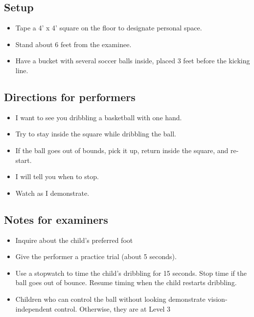 \documentclass[
  letterpaper,
  DIV=11,
  numbers=noendperiod]{scrreprt}
\providecommand{\tightlist}{%
  \setlength{\itemsep}{0pt}\setlength{\parskip}{0pt}}
\begin{document}
\subsection{Setup}\label{setup-2}

\begin{itemize}
\tightlist
\item
  Tape a 4' x 4' square on the floor to designate personal space.
\item
  Stand about 6 feet from the examinee.
\item
  Have a bucket with several soccer balls inside, placed 3 feet before
  the kicking line.
\end{itemize}

\subsection{Directions for
performers}\label{directions-for-performers-2}

\begin{itemize}
\tightlist
\item
  I want to see you dribbling a basketball with one hand.
\item
  Try to stay inside the square while dribbling the ball.
\item
  If the ball goes out of bounds, pick it up, return inside the square,
  and re-start.
\item
  I will tell you when to stop.
\item
  Watch as I demonstrate.
\end{itemize}

\subsection{Notes for examiners}\label{notes-for-examiners-2}

\begin{itemize}
\tightlist
\item
  Inquire about the child's preferred foot
\item
  Give the performer a practice trial (about 5 seconds).
\item
  Use a stopwatch to time the child's dribbling for 15 seconds. Stop
  time if the ball goes out of bounce. Resume timing when the child
  restarts dribbling.
\item
  Children who can control the ball without looking demonstrate
  vision-independent control. Otherwise, they are at Level 3
\end{itemize}
\end{document}
